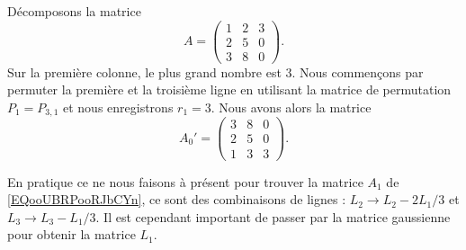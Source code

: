 \begin{example}
    Décomposons la matrice
    \begin{equation}
        A=\begin{pmatrix}
            1    &   2    &   3    \\
            2    &   5    &   0    \\
            3    &   8    &   0
        \end{pmatrix}.
    \end{equation}
    Sur la première colonne, le plus grand nombre est \( 3\). Nous commençons par permuter la première et la troisième ligne en utilisant la matrice de permutation \( P_1=P_{3,1}\) et nous enregistrons \( r_1=3\). Nous avons alors la matrice
    \begin{equation}        \label{EQooJCCLooOZVajj}
        A_0'=\begin{pmatrix}
            3    &   8    &   0    \\
            2    &   5    &   0    \\
            1    &   3    &   3
        \end{pmatrix}.
    \end{equation}

    En pratique ce ne nous faisons à présent pour trouver la matrice \( A_1\) de \eqref{EQooUBRPooRJbCYn}, ce sont des combinaisons de lignes : \( L_2\to L_2-2L_1/3\) et \( L_3\to L_3-L_1/3\). Il est cependant important de passer par la matrice gaussienne pour obtenir la matrice \( L_1\).


\end{example}
